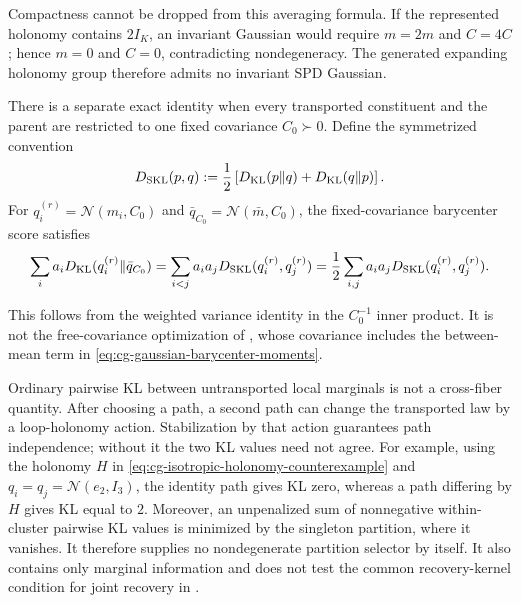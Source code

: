 Compactness cannot be dropped from this averaging formula. If the represented
holonomy contains \(2I_K\), an invariant Gaussian would require
\(m=2m\) and \(C=4C\); hence \(m=0\) and \(C=0\), contradicting
nondegeneracy. The generated expanding holonomy group therefore admits no
invariant SPD Gaussian. 

There is a separate exact identity when every transported constituent and
the parent are restricted to one fixed covariance \(C_0\succ0\). Define the
symmetrized convention
\begin{equation}
D_{\rm SKL}(p,q)
:=\frac12\left[D_{\mathrm{KL}}(p\Vert q)+D_{\mathrm{KL}}(q\Vert p)\right].
\label{eq:cg-symmetric-kl-convention}
\end{equation}
For \(q_i^{(r)}=\mathcal N(m_i,C_0)\) and
\(\bar q_{C_0}=\mathcal N(\bar m,C_0)\), the fixed-covariance barycenter
score satisfies
\begin{equation}
\sum_i a_iD_{\mathrm{KL}}(q_i^{(r)}\Vert\bar q_{C_0})
=\sum_{i<j}a_ia_jD_{\rm SKL}(q_i^{(r)},q_j^{(r)})
=\frac12\sum_{i,j}a_ia_jD_{\rm SKL}(q_i^{(r)},q_j^{(r)}).
\label{eq:cg-fixed-covariance-pairwise-identity}
\end{equation}

This follows from the weighted variance identity in the \(C_0^{-1}\) inner
product. It is not the free-covariance optimization of
, whose covariance includes the
between-mean term in \eqref{eq:cg-gaussian-barycenter-moments}.

Ordinary pairwise KL between untransported local marginals is not a
cross-fiber quantity. After choosing a path, a second path can change the
transported law by a loop-holonomy action. Stabilization by that action
guarantees path independence; without it the two KL values need not agree.
For example, using the holonomy \(H\) in
\eqref{eq:cg-isotropic-holonomy-counterexample} and
\(q_i=q_j=\mathcal N(e_2,I_3)\), the identity path gives KL zero, whereas a
path differing by \(H\) gives KL equal to \(2\). Moreover, an unpenalized sum
of nonnegative within-cluster pairwise KL values is minimized by the
singleton partition, where it vanishes. It therefore supplies no
nondegenerate partition selector by itself. It also contains only marginal
information and does not test the common recovery-kernel condition for joint
recovery in . 


